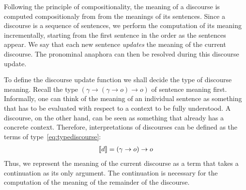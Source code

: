 Following the principle of compositionality, the meaning of a discourse is computed compositionaly from from the meanings of its sentences. Since a discourse is a sequence of sentences, we perform the computation of its meaning incrementally, starting from the first sentence in the order as the sentences appear. We say that each new sentence \emph{updates} the meaning of the current discourse. The pronominal anaphora can then be resolved during this discourse update. 

To define the discourse update function we shall decide the type of discourse meaning. Recall the type $( \gamma \rightarrow (\gamma \rightarrow o) \rightarrow o )$ of sentence meaning first. Informally, one can think of the meaning of an individual sentence as something that has to be evaluated with respect to a context to be fully understood.  A discourse, on the other hand, can be seen as something that already has a concrete context. Therefore, interpretations of discourses can be defined as the terms of type~\eqref{eq:typediscourse}:
\begin{align}
[\![d]\!] =  (\gamma \rightarrow o) \rightarrow o \label{eq:typediscourse}
\end{align}
Thus, we represent the meaning of the current discourse as a term that takes a continuation as its only argument. The continuation is necessary for the computation of the meaning of the remainder of the discourse.  


